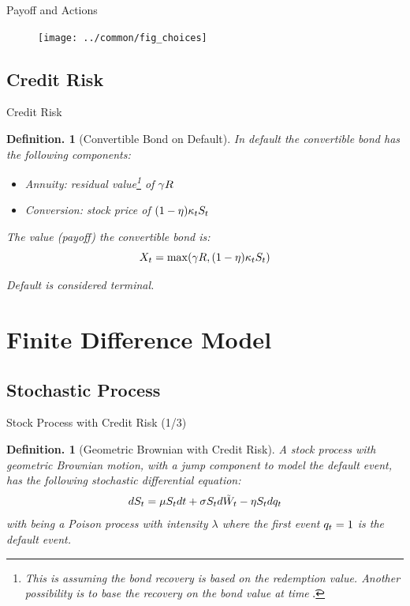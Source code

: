 \documentclass{beamer}
\newtheorem{defn}[thm]{Definition.}
\begin{document}
\begin{frame}{Payoff and Actions}
\begin{figure}[ht]
 \centering
 \texttt{[image: ../common/fig\_choices]}
\end{figure}
\end{frame}



\subsection{Credit Risk}

\begin{frame}{Credit Risk}
\begin{defn}[Convertible Bond on Default]
In default the convertible bond has the following components:
\begin{itemize}
 \item \emph{Annuity:} residual value\footnote{This is assuming the bond recovery is based on the redemption value.  Another possibility is to base the recovery on the bond value at time \t.} of $\gamma R$
 \item \emph{Conversion:} stock price of $(1 - \eta)\kappa_tS_t$
\end{itemize}

The value (payoff) the convertible bond is:
\begin{equation}
 X_t = \max(\gamma R, (1 - \eta)\kappa_tS_t)
\end{equation}

Default is considered terminal.
\end{defn}
\end{frame}


\section{Finite Difference Model} %


\subsection{Stochastic Process}

\begin{frame}{Stock Process with Credit Risk (1/3)}
\begin{defn}[Geometric Brownian with Credit Risk]
A stock process with geometric Brownian motion, with a jump component to model the default event, has the following stochastic differential equation:
\begin{equation}
 dS_t = \mu S_tdt + \sigma S_td\tilde{W}_t - \eta S_tdq_t
\end{equation}
with \q being a Poison process with intensity $\lambda$ where the first event $q_t = 1$ is the default event.
\end{defn}
\end{frame}
\end{document}
